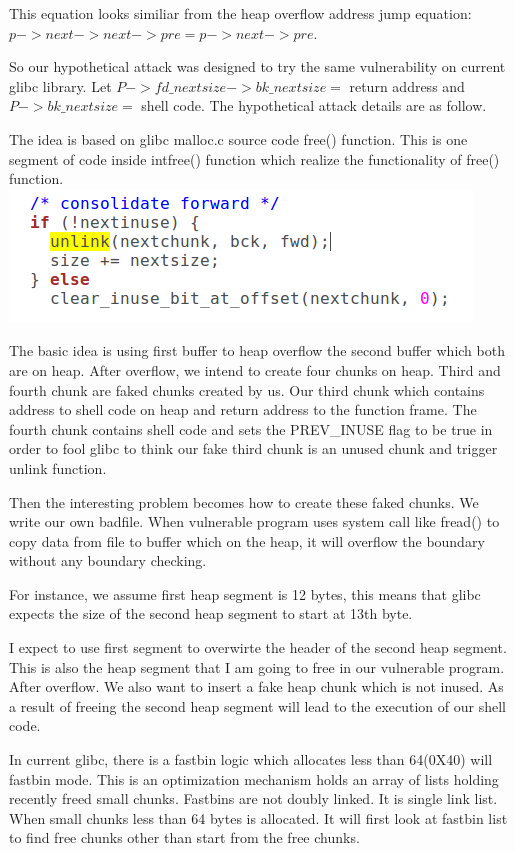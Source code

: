 \documentclass[12pt]{article}
\begin{document}
This equation looks similiar from the heap overflow address jump equation:$p->next->next->pre = p->next->pre$. 

So our hypothetical attack was designed to try the same vulnerability on current glibc library. Let $P->fd\_nextsize->bk\_nextsize =$ return address and $P->bk\_nextsize=$ shell code. The hypothetical attack details are as follow.   

The idea is based on glibc malloc.c source code free() function. This is one segment of code inside intfree() function which realize the functionality of free() function. \\
\includegraphics[scale=0.5]{unlink_next_free_chunk.png}

The basic idea is using first buffer to heap overflow the second buffer which both are on heap. After overflow, we intend to create four chunks on heap. Third and fourth chunk are faked chunks created by us. Our third chunk which contains address to shell code on heap and return address to the function frame. The fourth chunk contains shell code and sets the PREV\_INUSE flag to be true in order to fool glibc to think our fake third chunk is an unused chunk and trigger unlink function.  

Then the interesting problem becomes how to create these faked chunks. We write our own badfile. When vulnerable program uses system call like fread() to copy data from file to buffer which on the heap, it will overflow the boundary without any boundary checking.

For instance, we assume first heap segment is 12 bytes, this means that glibc expects the size of the second heap segment to start at 13th byte.

I expect to use first segment to overwirte the header of the second heap segment. This is also the heap segment that I am going to free in our vulnerable program. After overflow. We also want to insert a fake heap chunk which is not inused. As a result of freeing the second heap segment will lead to the execution of our shell code.

In current glibc, there is a fastbin logic which allocates less than 64(0X40) will fastbin mode. This is an optimization mechanism holds an array of lists holding recently freed small chunks. Fastbins are not doubly linked. It is single link list. When small chunks less than 64 bytes is allocated. It will first look at fastbin list to find free chunks other than start from the free chunks. 
\end{document}
